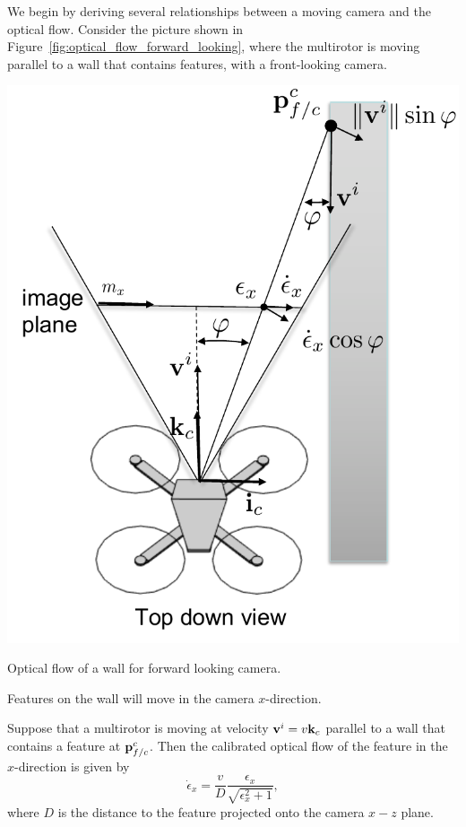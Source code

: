 We begin by deriving several relationships between a moving camera and the optical flow. 
%
Consider the picture shown in Figure~\ref{fig:optical_flow_forward_looking}, where the multirotor is moving parallel to a wall that contains features, with a front-looking camera.  
\begin{marginfigure}
	\includegraphics[width=\linewidth]{chap7_optical_flow/figures/optical_flow_forward_looking}
	\caption{Optical flow of a wall for forward looking camera.}
	\label{fig:optical_flow_forward_looking}
\end{marginfigure}
Features on the wall will move in the camera $x$-direction.
\begin{theorem}\label{thm:epsilon_x_dot_forward_looking}
	Suppose that a multirotor is moving at velocity $\mathbf{v}^i = v\mathbf{k}_c$ parallel to a wall that contains a feature at $\mathbf{p}_{f/c}^c$.  Then the calibrated optical flow of the feature in the $x$-direction is given by
	\begin{equation}\label{eq:epsilon_x_dot_forward_looking}
	\dot{\epsilon}_x = \frac{v}{D}\frac{\epsilon_x}{\sqrt{\epsilon_x^2 + 1}},
	\end{equation}
	where $D$ is the distance to the feature projected onto the camera $x-z$ plane.
\end{theorem}
